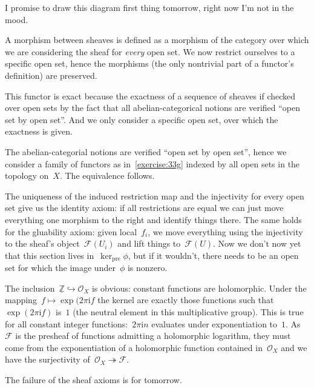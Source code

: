 \begin{exercise} %
  I promise to draw this diagram first thing tomorrow, right now I'm not in the mood.
\end{exercise}

\begin{exercise}
  \label{exercise:33g}
  A morphism between sheaves is defined as a morphism of the category over which we are considering the sheaf for \emph{every} open set. We now restrict ourselves to a specific open set, hence the morphisms (the only nontrivial part of a functor's definition) are preserved. 

  This functor is exact because the exactness of a sequence of sheaves if checked over open sets by the fact that all abelian-categorical notions are verified ``open set by open set''. And we only consider a specific open set, over which the exactness is given.
\end{exercise}

\begin{exercise}
  The abelian-categorial notions are verified ``open set by open set'', hence we consider a family of functors as in~\autoref{exercise:33g} indexed by all open sets in the topology on~$X$. The equivalence follows.
\end{exercise}

\begin{exercise} %
  The uniqueness of the induced restriction map and the injectivity for every open set give us the identity axiom: if all restrictions are equal we can just move everything one morphism to the right and identify things there. The same holds for the gluability axiom: given local~$f_i$, we move everything using the injectivity to the sheaf's object~$\mathcal{F}(U_i)$ and lift things to~$\mathcal{F}(U)$. Now we don't now yet that this section lives in~$\ker_{\textrm{pre}}\phi$, but if it wouldn't, there needs to be an open set for which the image under~$\phi$ is nonzero. %
\end{exercise}

\begin{exercise} %
  The inclusion~$\underline{\mathbb{Z}}\hookrightarrow\mathcal{O}_X$ is obvious: constant functions are holomorphic. Under the mapping~$f\mapsto\exp(2\pi\mathrm{i}f$ the kernel are exactly those functions such that~$\exp(2\pi\mathrm{i}f)$ is~$1$ (the neutral element in this multiplicative group). This is true for all constant integer functions:~$2\pi\mathrm{i}n$ evaluates under exponentiation to~$1$. As~$\mathcal{F}$ is the presheaf of functions admitting a holomorphic logarithm, they must come from the exponentiation of a holomorphic function contained in~$\mathcal{O}_X$ and we have the surjectivity of~$\mathcal{O}_X\twoheadrightarrow\mathcal{F}$.

  The failure of the sheaf axioms is for tomorrow.
\end{exercise}
